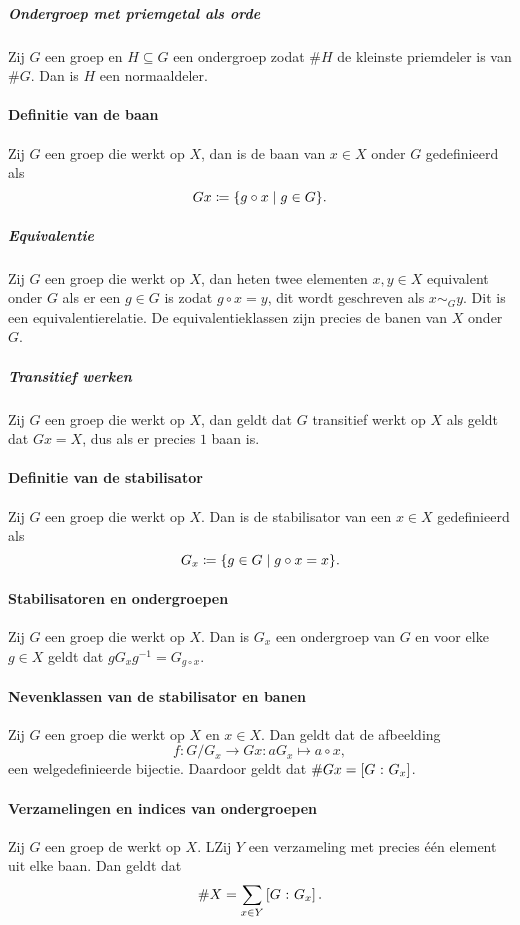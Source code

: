 \subparagraph{Ondergroep met priemgetal als orde} Zij \(G\) een groep en \(H\subseteq G\) een ondergroep zodat \(\#H\) de kleinste priemdeler is van \(\#G\). Dan is \(H\) een normaaldeler.

\paragraph{Definitie van de baan} Zij \(G\) een groep die werkt op \(X\), dan is de baan van \(x\in X\) onder \(G\) gedefinieerd als
\[
    Gx\coloneqq\{g\circ x\mid g\in G\}.
\]

\subparagraph{Equivalentie} Zij \(G\) een groep die werkt op \(X\), dan heten twee elementen \(x,y\in X\) equivalent onder \(G\) als er een \(g\in G\) is zodat \(g\circ x=y\), dit wordt geschreven als \(x\sim_{G}y\). Dit is een equivalentierelatie. De equivalentieklassen zijn precies de banen van \(X\) onder \(G\).

\subparagraph{Transitief werken} Zij \(G\) een groep die werkt op \(X\), dan geldt dat \(G\) transitief werkt op \(X\) als geldt dat \(Gx=X\), dus als er precies \(1\) baan is.

\paragraph{Definitie van de stabilisator} Zij \(G\) een groep die werkt op \(X\). Dan is de stabilisator van een \(x\in X\) gedefinieerd als
\[
    G_{x}\coloneqq \{g\in G\mid g\circ x=x\}.
\]

\paragraph{Stabilisatoren en ondergroepen} Zij \(G\) een groep die werkt op \(X\). Dan is \(G_{x}\) een ondergroep van \(G\) en voor elke \(g\in X\) geldt dat \(gG_{x}g^{-1}=G_{g\circ x}\).

\paragraph{Nevenklassen van de stabilisator en banen} Zij \(G\) een groep die werkt op \(X\) en \(x\in X\). Dan geldt dat de afbeelding
\[
    f\colon G/G_{x}\to Gx\colon aG_{x}\mapsto a\circ x,
\]
een welgedefinieerde bijectie. Daardoor geldt dat \(\#Gx=\left[G\>\colon G_{x}\right]\).

\paragraph{Verzamelingen en indices van ondergroepen} Zij \(G\) een groep de werkt op \(X\). LZij \(Y\) een verzameling met precies één element uit elke baan. Dan geldt dat
\[
    \#X=\sum_{x\in Y}\left[G\>\colon G_{x}\right].
\]


